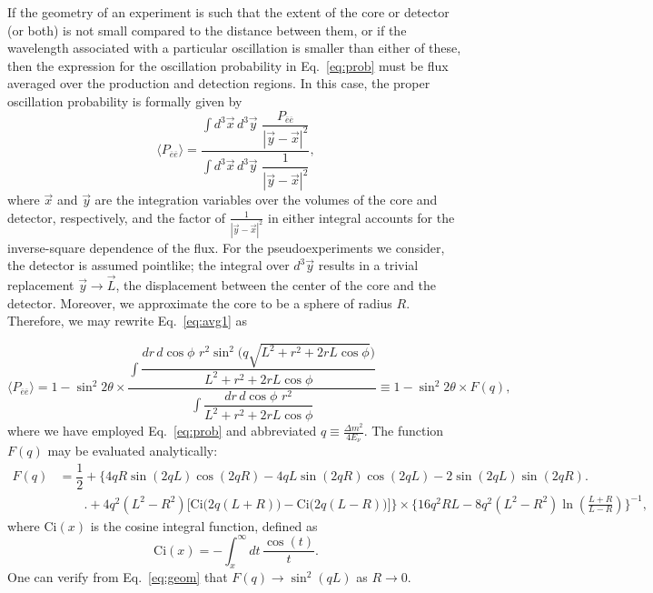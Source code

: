 \documentclass[prd, twocolumn, tightenlines, twoside, secnumarabic, superscriptaddress, preprintnumbers, nofootinbib, notitlepage]{revtex4-1}
\begin{document}
If the geometry of an experiment is such that the extent of the core or detector (or both) is not small compared to the distance between them, or if the wavelength associated with a particular oscillation is smaller than either of these, then the expression for the oscillation probability in Eq.~\eqref{eq:prob} must be flux averaged over the production and detection regions. In this case, the proper oscillation probability is formally given by
\begin{equation}
    \label{eq:avg1}
    \langle P_{\overline e \overline e} \rangle = \dfrac{\int d^3 \vec x \, d^3 \vec y \, \, \dfrac{P_{\overline e \overline e}}{|\vec y - \vec x|^2}}{\int d^3 \vec x \, d^3 \vec y \, \,  \dfrac{1}{|\vec y - \vec x|^2}},
\end{equation}
where $\vec x$ and $\vec y$ are the integration variables over the volumes of the core and detector, respectively, and the factor of $\frac{1}{|\vec y - \vec x|^2}$ in either integral accounts for the inverse-square dependence of the flux. For the pseudoexperiments we consider, the detector is assumed pointlike; the integral over $d^3 \vec y$ results in a trivial replacement $\vec y \to \vec L$, the displacement between the center of the core and the detector. Moreover, we approximate the core to be a sphere of radius $R$. Therefore, we may rewrite Eq.~\eqref{eq:avg1} as
\begin{widetext}
\begin{equation}
    \langle P_{\overline e \overline e} \rangle = 1 - \sin^2 2\theta \times \dfrac{\int \dfrac{dr \, d\cos \phi \, \, r^2 \sin^2 \big(q \sqrt{L^2 + r^2 + 2 r L \cos \phi}\big)}{L^2 + r^2 + 2 r L \cos \phi}}{\int \dfrac{dr \, d\cos \phi \, \, r^2}{L^2 + r^2 + 2 r L \cos \phi}} \equiv 1 - \sin^2 2\theta \times F(q),
\end{equation}
where we have employed Eq.~\eqref{eq:prob} and abbreviated $q \equiv \frac{\Delta m^2}{4E_\nu}$. The function $F(q)$ may be evaluated analytically:
\begin{align}
    F(q) & = \dfrac{1}{2} + \Big\{4qR \sin(2qL) \cos(2qR) - 4qL \sin(2qR) \cos(2qL) -2\sin(2qL) \sin(2qR) \Big. \nonumber \\
    & \qquad \Big. + 4q^2(L^2-R^2) \Big[ \text{Ci}\big(2q(L+R)\big) - \text{Ci}\big(2q(L-R)\big)\Big] \Big\} \times \Big\{16q^2RL - 8q^2(L^2-R^2)\ln \left(\frac{L+R}{L-R}\right) \Big\}^{-1},
    \label{eq:geom}
\end{align}
where Ci$(x)$ is the cosine integral function, defined as
\begin{equation}
    \text{Ci}(x) = -\int_x^{\infty} dt \, \frac{\cos(t)}{t}.
\end{equation}
One can verify from Eq.~\eqref{eq:geom} that $F(q)\to \sin^2(q L)$ as $R\to0$.
\end{widetext}




\end{document}
